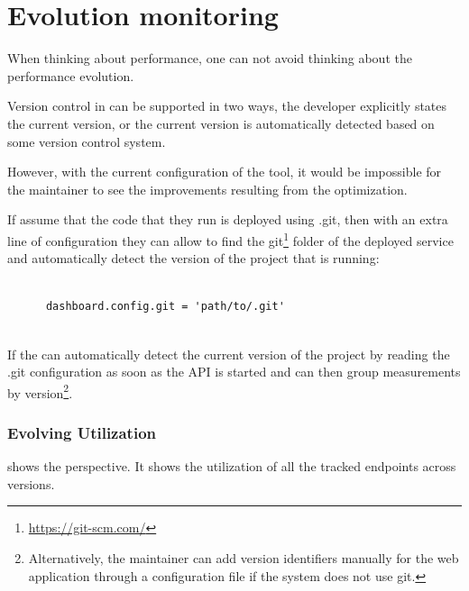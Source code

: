 


  
  \section{Evolution monitoring }
  

  When thinking about performance, 
  one can not avoid thinking about the performance evolution. 

  Version control in \tool can be supported in two ways,
  the developer explicitly states the current version, 
  or the current version is automatically detected based
  on some version control system. 


  However, with the current configuration of the tool, it would be impossible for the maintainer to see the improvements resulting from the optimization. 

  If assume that the code that they run is deployed using .git, then with an extra line of configuration they can allow \tool to find the git\footnote{\url{https://git-scm.com/}} folder of the deployed service and automatically detect the version of the project that is running: 
    
    \begin{lstlisting}[style=custompython]
    
      dashboard.config.git = 'path/to/.git'
      
    \end{lstlisting}  
 
  If the \tool can automatically detect the current version of the project by reading the .git configuration as soon as the API is started and can then group measurements by version\footnote{Alternatively, the maintainer can add version identifiers manually for the web application through a configuration file if the system does not use git.}. 


  

  \subsubsection*{Evolving Utilization}

   shows the  perspective. 
  It shows the utilization of all the tracked endpoints across versions.

